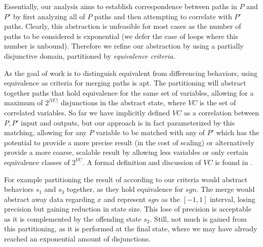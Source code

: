 Essentially, our analysis aims to establish correspondence between paths in $P$ and $P'$ by first analyzing all of $P$ paths and then attempting to correlate with $P'$ paths. Clearly, this abstraction is unfeasible for most cases as the number of paths to be considered is exponential (we defer the case of loops where this number is unbound). Therefore we refine our abstraction by using a partially disjunctive domain, partitioned by \emph{equivalence criteria}.


As the goal of work is to distinguish equivalent from differencing behaviors, using equivalence as criteria for merging paths is apt. The partitioning will abstract together paths that hold equivalence for the same set of variables, allowing for a maximum of $2^{|VC|}$ disjunctions in the abstract state, where $VC$ is the set of correlated variables. So far we have implicitly defined $VC$ as a correlation between $P,P'$ input and outputs, but our approach is in fact parameterized by this matching, allowing for any $P$ variable to be matched with any of $P'$ which has the potential to provide a more precise result (in the cost of scaling) or alternatively provide a more coarse, scalable result by allowing less variables or only certain equivalence classes of $2^{VC}$. A formal definition and discussion of $VC$ is found in .

For example partitioning the result of  according to our criteria would abstract behaviors $s_1$ and $s_3$ together, as they hold equivalence for $sgn$. The merge would abstract away data regarding $x$ and represent $sgn$ as the $[-1,1]$ interval, losing precision but gaining reduction in state size. This lose of precision is acceptable as it is complemented by the offending state $s_2$. Still, not much is gained from this partitioning, as it is performed at the final state, where we may have already reached an exponential amount of disjunctions.

